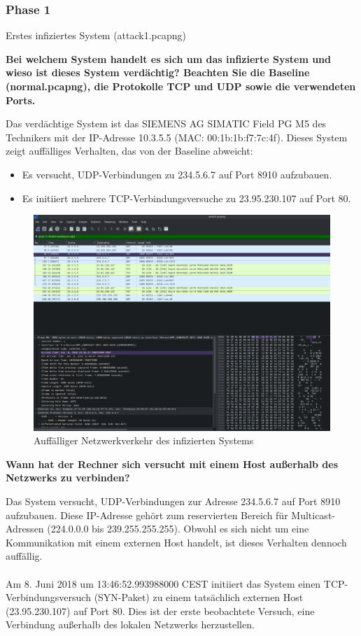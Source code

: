 \documentclass[
    a4paper,
    pagesize,
	pdftex,
    12pt,
]{scrartcl}
\begin{document}
\subsubsection{Phase 1}
Erstes infiziertes System (attack1.pcapng)

\textbf{Bei welchem System handelt es sich um das infizierte System und wieso ist dieses System verdächtig? Beachten Sie die Baseline (normal.pcapng), die Protokolle TCP und UDP sowie die verwendeten Ports.}

Das verdächtige System ist das SIEMENS AG SIMATIC Field PG M5 des Technikers mit der IP-Adresse 10.3.5.5 (MAC: 00:1b:1b:f7:7c:4f). Dieses System zeigt auffälliges Verhalten, das von der Baseline abweicht:

\begin{itemize}
    \item Es versucht, UDP-Verbindungen zu 234.5.6.7 auf Port 8910 aufzubauen.
    \item Es initiiert mehrere TCP-Verbindungsversuche zu 23.95.230.107 auf Port 80.
\end{itemize}

\begin{figure}[H]
    \centering
    \includegraphics[width=\textwidth]{ws-suspicious-traffic.png}
    \caption{Auffälliger Netzwerkverkehr des infizierten Systems}
    \label{fig:ws-suspicious-traffic}
\end{figure}

\textbf{Wann hat der Rechner sich versucht mit einem Host außerhalb des Netzwerks zu verbinden?}

Das System versucht, UDP-Verbindungen zur Adresse 234.5.6.7 auf Port 8910 aufzubauen. Diese IP-Adresse gehört zum reservierten Bereich für Multicast-Adressen (224.0.0.0 bis 239.255.255.255). Obwohl es sich nicht um eine Kommunikation mit einem externen Host handelt, ist dieses Verhalten dennoch auffällig.
\\ \\
Am 8. Juni 2018 um 13:46:52.993988000 CEST initiiert das System einen TCP-Verbindungsversuch (SYN-Paket) zu einem tatsächlich externen Host (23.95.230.107) auf Port 80. Dies ist der erste beobachtete Versuch, eine Verbindung außerhalb des lokalen Netzwerks herzustellen.
\end{document}
